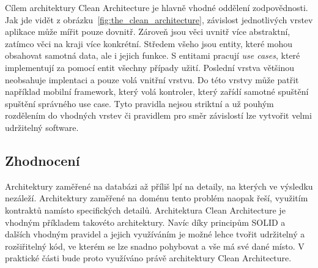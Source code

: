 Cílem architektury Clean Architecture je hlavně vhodné oddělení zodpovědnosti.
Jak jde vidět z obrázku~\ref{fig:the_clean_architecture},
závislost jednotlivých vrstev aplikace může mířit pouze dovnitř.
Zároveň jsou věci uvnitř více abstraktní,
zatímco věci na kraji více konkrétní.
Středem všeho jsou entity,
které mohou obsahovat samotná data,
ale i jejich funkce.
S entitami pracují \emph{use cases},
které implementují za pomocí entit všechny případy užití.
Poslední vrstva většinou neobsahuje implentaci a pouze volá vnitřní vrstvu.
Do této vrstvy může patřit například mobilní framework,
který volá kontroler,
který zařídí samotné spuštění spuštění správného use case.
Tyto pravidla nejsou striktní a už pouhým rozdělením do vhodných vrstev
či pravidlem pro směr závislostí lze vytvořit velmi udržitelný
software.~\cite{the_clean_architecture}

\subsection{Zhodnocení}

Architektury zaměřené na databázi až příliš lpí na detaily,
na kterých ve výsledku nezáleží.
Architektury zaměřené na doménu tento problém naopak řeší,
využitím kontraktů namísto specifických detailů.
Architektura Clean Architecture je vhodným příkladem takovéto architektury.
Navíc díky principům SOLID a dalších vhodným pravidel a jejich využíváním
je možné lehce tvořit udržitelný a rozšiřitelný kód,
ve kterém se lze snadno pohybovat a vše má své dané místo.
V praktické části bude proto využíváno právě architektury Clean Architecture.
